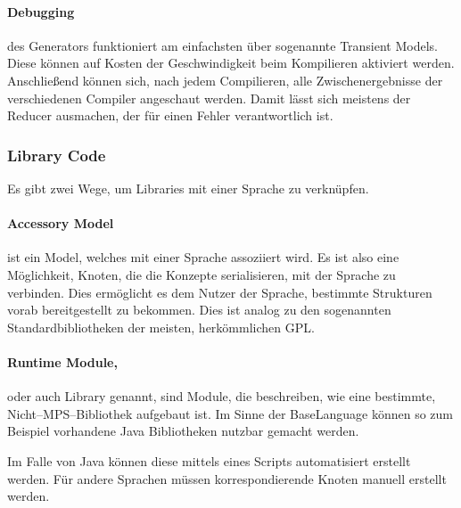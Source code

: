 \paragraph{Debugging} des Generators funktioniert am einfachsten über sogenannte Transient Models.
Diese können auf Kosten der Geschwindigkeit beim Kompilieren aktiviert werden.
Anschließend können sich, nach jedem Compilieren, alle Zwischenergebnisse der verschiedenen Compiler angeschaut werden.
Damit lässt sich meistens der Reducer ausmachen, der für einen Fehler verantwortlich ist.

\subsubsection{Library Code}
Es gibt zwei Wege, um Libraries mit einer Sprache zu verknüpfen.

\paragraph{Accessory Model} ist ein Model, welches mit einer Sprache assoziiert wird.
Es ist also eine Möglichkeit, Knoten, die die Konzepte serialisieren, mit der Sprache zu verbinden.
Dies ermöglicht es dem Nutzer der Sprache, bestimmte Strukturen vorab bereitgestellt zu bekommen.
Dies ist analog zu den sogenannten Standardbibliotheken der meisten, herkömmlichen \ac{GPL}.

\paragraph{Runtime Module,} oder auch Library genannt, sind Module, die beschreiben, wie eine bestimmte, Nicht--\acs{MPS}--Bibliothek aufgebaut ist.
Im Sinne der BaseLanguage können so zum Beispiel vorhandene Java Bibliotheken nutzbar gemacht werden.

Im Falle von Java können diese mittels eines Scripts automatisiert erstellt werden.
Für andere Sprachen müssen korrespondierende Knoten manuell erstellt werden.
